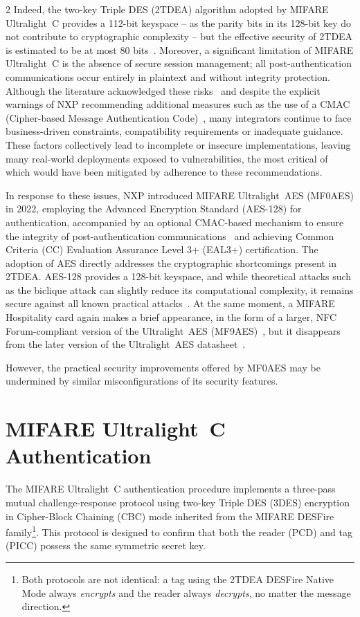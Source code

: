 \documentclass[10pt,letterpaper]{article}
\begin{document}
\begin{multicols}{2}
Indeed, the two-key Triple DES (2TDEA) algorithm adopted by MIFARE Ultralight~C provides a 112-bit keyspace -- as the parity bits in its 128-bit key do not contribute to cryptographic complexity -- but the effective security of 2TDEA is estimated to be at most 80 bits~\cite{nist_sp800-57p1r5}.
Moreover, a significant limitation of MIFARE Ultralight~C is the absence of secure session management; all post-authentication communications occur entirely in plaintext and without integrity protection. 
Although the literature acknowledged these risks~\cite{aura_design, nxp_an12265} and despite the explicit warnings of NXP recommending additional measures such as the use of a CMAC (Cipher-based Message Authentication Code)~\cite{nxp_an12265}, many integrators continue to face business-driven constraints, compatibility requirements or inadequate guidance. These factors collectively lead to incomplete or insecure implementations, leaving many real-world deployments exposed to vulnerabilities, the most critical of which would have been mitigated by adherence to these recommendations.

In response to these issues, NXP introduced MIFARE Ultralight~AES (MF0AES) in 2022, employing the Advanced Encryption Standard (AES-128) for authentication, accompanied by an optional CMAC-based mechanism to ensure the integrity of post-authentication communications~\cite{mf0aes_3r2_2023} and achieving Common Criteria (CC) Evaluation Assurance Level 3+ (EAL3+) certification. The adoption of AES directly addresses the cryptographic shortcomings present in 2TDEA. AES-128 provides a 128-bit keyspace, and while theoretical attacks such as the biclique attack can slightly reduce its computational complexity, it remains secure against all known practical attacks~\cite{bogdanov_biclique_2011}.
At the same moment, a MIFARE Hospitality card again makes a brief appearance, in the form of a larger, NFC Forum-compliant version of the Ultralight~AES (MF9AES)~\cite{mf0aes_3r0_2022}, but it disappears from the later version of the Ultralight~AES datasheet~\cite{mf0aes_3r2_2023}.

However, the practical security improvements offered by MF0AES may be undermined by similar misconfigurations of its security features.

\section{MIFARE Ultralight~C Authentication}
\label{sec:ulc_auth}
The MIFARE Ultralight~C authentication procedure implements a three-pass mutual challenge-response protocol using two-key Triple DES (3DES) encryption in Cipher-Block Chaining (CBC) mode inherited from the MIFARE DESFire family\footnote{Both protocols are not identical: a tag using the 2TDEA DESFire Native Mode always \emph{encrypts} and the reader always \emph{decrypts}, no matter the message direction.}. This protocol is designed to confirm that both the reader (PCD) and tag (PICC) possess the same symmetric secret key.


\end{multicols}
\end{document}
